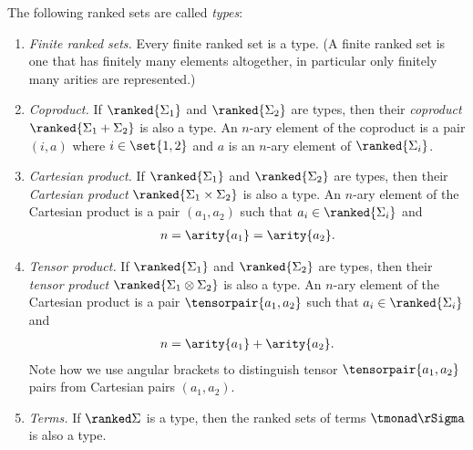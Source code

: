 \begin{definition}[Types] \label{def:types} The following ranked sets are called \emph{types}:
    \begin{enumerate}
        \item  \emph{Finite ranked sets.} Every finite  ranked set is a type. (A finite ranked set is one that  has finitely many elements altogether, in particular only finitely many arities are represented.)
        \item \emph{Coproduct.} If $\ranked{\Sigma_1}$ and $\ranked{\Sigma_2}$ are types, then  their \emph{coproduct} $\ranked{\Sigma_1 + \Sigma_2}$
        is also a type. An $n$-ary element of the coproduct is a pair $(i,a)$ where $i \in \set{1,2}$ and $a$ is an $n$-ary element of  $\ranked{\Sigma_i}$. 
        \item \emph{Cartesian product.} If $\ranked{\Sigma_1}$ and $\ranked{\Sigma_2}$ are types, then  their \emph{Cartesian product}
        $ \ranked{\Sigma_1 \times \Sigma_2}$
        is also a type. An $n$-ary element of the Cartesian product is a pair $(a_1,a_2)$ such that $a_i \in \ranked{\Sigma_i}$ and 
        \begin{align*}
            n = \arity{a_1} = \arity{a_2}.
        \end{align*}
        \item \emph{Tensor product.} If $\ranked{\Sigma_1}$ and $\ranked{\Sigma_2}$ are types, then  their \emph{tensor product}
        $ \ranked{\Sigma_1 \otimes \Sigma_2}$
        is also a type. An $n$-ary element of the Cartesian product is a pair $\tensorpair{a_1,a_2}$ such that $a_i \in \ranked{\Sigma_i}$ and 
        \begin{align*}
            n = \arity{a_1} + \arity{a_2}.
        \end{align*}
        Note how we use  angular brackets to distinguish tensor $\tensorpair{a_1,a_2}$ pairs from Cartesian pairs $(a_1,a_2)$.
        \item \emph{Terms.} If $\ranked \Sigma$ is a type, then  the ranked sets of terms  $\tmonad \rSigma$ is also a type.
    \end{enumerate}
\end{definition}


